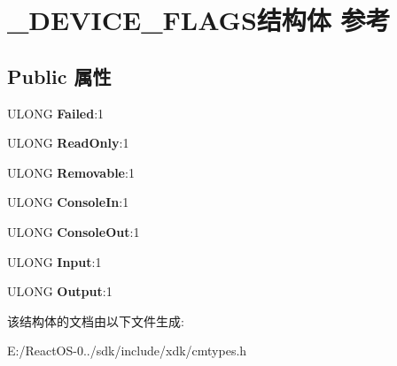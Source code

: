 \hypertarget{struct___d_e_v_i_c_e___f_l_a_g_s}{}\section{\+\_\+\+D\+E\+V\+I\+C\+E\+\_\+\+F\+L\+A\+G\+S结构体 参考}
\label{struct___d_e_v_i_c_e___f_l_a_g_s}
\subsection*{Public 属性}
\begin{DoxyCompactItemize}
\item 
\mbox{\label{struct___d_e_v_i_c_e___f_l_a_g_s_a95f3a2996bbf39224004dd32eb1f2822}} 
U\+L\+O\+NG {\bfseries Failed}\+:1
\item 
\mbox{\label{struct___d_e_v_i_c_e___f_l_a_g_s_a2980ce8b471d9719729bc7d85290e964}} 
U\+L\+O\+NG {\bfseries Read\+Only}\+:1
\item 
\mbox{\label{struct___d_e_v_i_c_e___f_l_a_g_s_aab5d26cc8b6526c6233a6d5b6c44b016}} 
U\+L\+O\+NG {\bfseries Removable}\+:1
\item 
\mbox{\label{struct___d_e_v_i_c_e___f_l_a_g_s_ad509df6459c45ef47eace3e4f8aa9798}} 
U\+L\+O\+NG {\bfseries Console\+In}\+:1
\item 
\mbox{\label{struct___d_e_v_i_c_e___f_l_a_g_s_a2cf512ab17cae8fbb0790f89710d9326}} 
U\+L\+O\+NG {\bfseries Console\+Out}\+:1
\item 
\mbox{\label{struct___d_e_v_i_c_e___f_l_a_g_s_a332f80712bbf1a8f8ab81a7146988ec2}} 
U\+L\+O\+NG {\bfseries Input}\+:1
\item 
\mbox{\label{struct___d_e_v_i_c_e___f_l_a_g_s_a333c3f82ed45260e17bf9686d0c58e3d}} 
U\+L\+O\+NG {\bfseries Output}\+:1
\end{DoxyCompactItemize}


该结构体的文档由以下文件生成\+:\begin{DoxyCompactItemize}
\item 
E\+:/\+React\+O\+S-\/0../sdk/include/xdk/cmtypes.\+h\end{DoxyCompactItemize}
